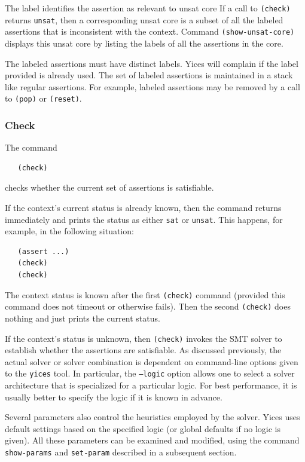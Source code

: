 \documentclass[11pt,twoside,fleqn,openright,titlepage]{cslreport}
\begin{document}
\medskip\noindent
The label identifies the assertion as relevant to unsat core If a call
to \texttt{(check)} returns \texttt{unsat}, then a corresponding unsat
core is a subset of all the labeled assertions that is inconsistent
with the context. Command \texttt{(show-unsat-core)} displays this
unsat core by listing the labels of all the assertions in the core.

\medskip\noindent The labeled assertions must have distinct
labels. Yices will complain if the label provided is already used. The
set of labeled assertions is maintained in a stack like regular
assertions. For example, labeled assertions may be removed by a call
to \texttt{(pop)} or \texttt{(reset)}.


\subsubsection*{Check}

The command
\begin{small}
\begin{verbatim}
   (check)
\end{verbatim}
\end{small}
checks whether the current set of assertions is satisfiable.

\medskip\noindent
If the context's current status is already known, then the command
returns immediately and prints the status as either \texttt{sat} or
\texttt{unsat}. This happens, for example, in the following situation:
\begin{small}
\begin{verbatim}
   (assert ...)
   (check)
   (check)
\end{verbatim}
\end{small}
The context status is known after the first \texttt{(check)} command
(provided this command does not timeout or otherwise fails). Then the
second \texttt{(check)} does nothing and just prints the current
status.

\medskip\noindent
If the context's status is unknown, then \texttt{(check)} invokes the
SMT solver to establish whether the assertions are satisfiable. As
discussed previously, the actual solver or solver combination is
dependent on command-line options given to the \texttt{yices} tool. In
particular, the \texttt{--logic} option allows one to select a solver
architecture that is specialized for a particular logic. For best
performance, it is usually better to specify the logic if it is known
in advance.

\medskip\noindent Several parameters also control the heuristics employed
by the solver. Yices uses default settings based on the specified logic
(or global defaults if no logic is given). All these parameters can be
examined and modified, using the command \texttt{show-params} and
\texttt{set-param} described in a subsequent section.
\end{document}
